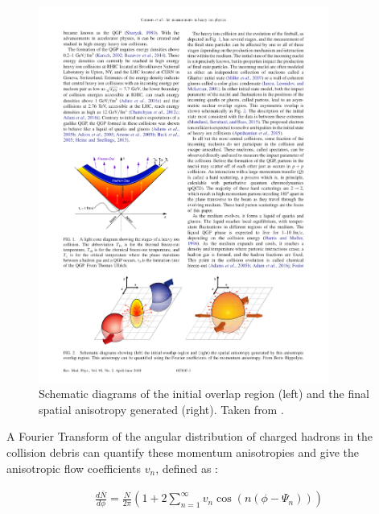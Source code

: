 \begin{figure}[htbp]
\begin{center}
\includegraphics[width=0.85\textwidth]{figures/theory/overlap}
\caption{Schematic diagrams of the initial overlap region (left) and the final spatial anisotropy generated (right). Taken from \cite{RevModPhys.90.025005}.}
\label{fig:overlap}
\end{center}
\end{figure}


A Fourier Transform of the angular distribution of charged hadrons in the collision debris can quantify these momentum anisotropies and give the anisotropic flow coefficients $v_n$, defined as \cite{Poskanzer:1998yz}:

\begin{align}
\frac{d\bar{N}}{d\phi} = \frac{N}{2\pi} \left( 1 + 2 \sum_{n=1}^{\infty} v_{n} \cos(n(\phi-\Psi_n)) \right)
\end{align}

